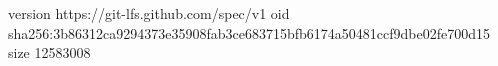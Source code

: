version https://git-lfs.github.com/spec/v1
oid sha256:3b86312ca9294373e35908fab3ce683715bfb6174a50481ccf9dbe02fe700d15
size 12583008
